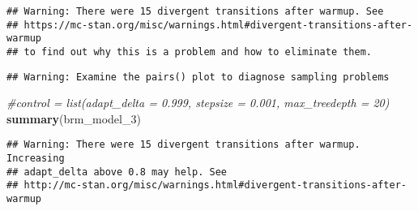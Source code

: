 \documentclass[
]{article}
\newenvironment{Shaded}{\begin{snugshade}}{\end{snugshade}}
\newcommand{\CommentTok}[1]{\textcolor[rgb]{0.56,0.35,0.01}{\textit{#1}}}
\newcommand{\FunctionTok}[1]{\textcolor[rgb]{0.13,0.29,0.53}{\textbf{#1}}}
\newcommand{\NormalTok}[1]{#1}
\begin{document}
\begin{verbatim}
## Warning: There were 15 divergent transitions after warmup. See
## https://mc-stan.org/misc/warnings.html#divergent-transitions-after-warmup
## to find out why this is a problem and how to eliminate them.
\end{verbatim}

\begin{verbatim}
## Warning: Examine the pairs() plot to diagnose sampling problems
\end{verbatim}

\begin{Shaded}
\begin{Highlighting}[]
\CommentTok{\#control = list(adapt\_delta = 0.999, stepsize = 0.001, max\_treedepth = 20)}
\FunctionTok{summary}\NormalTok{(brm\_model\_3)}
\end{Highlighting}
\end{Shaded}

\begin{verbatim}
## Warning: There were 15 divergent transitions after warmup. Increasing
## adapt_delta above 0.8 may help. See
## http://mc-stan.org/misc/warnings.html#divergent-transitions-after-warmup
\end{verbatim}
\end{document}
